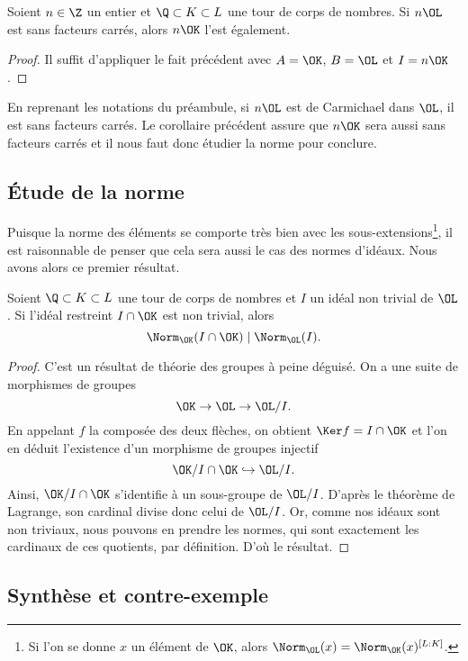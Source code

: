 \documentclass[a4paper, 12pt, oneside]{article}
\begin{document}
\begin{corollaire}Soient $n\in \Z$ un entier et $\Q\subset K\subset L$ une tour de corps de nombres. Si $n\OL$ est sans facteurs carrés, alors $n\OK$ l'est également.
\end{corollaire}

\begin{proof}Il suffit d'appliquer le fait précédent avec $A=\OK$, $B=\OL$ et $I = n\OK$.
\end{proof}

En reprenant les notations du préambule, si $n\OL$ est de Carmichael dans $\OL$, il est sans facteurs carrés. Le corollaire précédent assure que $n\OK$ sera aussi sans facteurs carrés et il nous faut donc étudier la norme pour conclure.

\subsection{Étude de la norme}

Puisque la norme des éléments se comporte très bien avec les sous-extensions\footnote{Si l'on se donne $x$ un élément de $\OK$, alors $\Norm_{\OL}(x) = \Norm_{\OK}(x)^{[L : K]}$.}, il est raisonnable de penser que cela sera aussi le cas des normes d'idéaux. Nous avons alors ce premier résultat.

\begin{fait}\label{fait1} 
	Soient $\Q\subset K \subset L$ une tour de corps de nombres et $I$ un idéal non trivial de $\OL$. Si l'idéal restreint $I\cap \OK$ est non trivial, alors $$\Norm_{\OK}(I \cap \OK) \mid \Norm_{\OL}(I).$$
\end{fait}

\begin{proof}
C'est un résultat de théorie des groupes à peine déguisé. On a une suite de morphismes de groupes $$\OK\to \OL \to \OL/I.$$ En appelant $f$ la composée des deux flèches, on obtient $\Ker f = I\cap \OK$ et l'on en déduit l'existence d'un morphisme de groupes injectif $$\OK/I\cap \OK \hookrightarrow \OL/I.$$ Ainsi, $\OK/ I\cap \OK$ s'identifie à un sous-groupe de $\OL/I$. D'après le théorème de Lagrange, son cardinal divise donc celui de $\OL/I$. Or, comme nos idéaux sont non triviaux, nous pouvons en prendre les normes, qui sont exactement les cardinaux de ces quotients, par définition. D'où le résultat.
\end{proof}

\subsection{Synthèse et contre-exemple}
\end{document}
